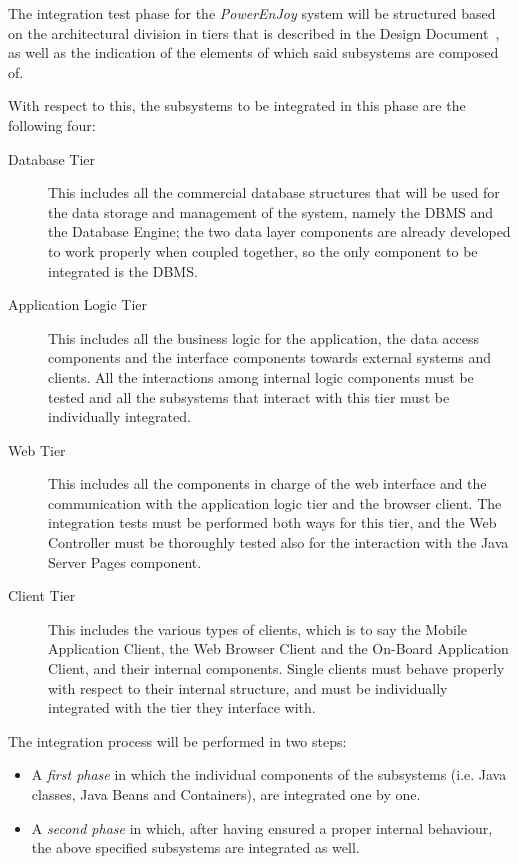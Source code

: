 The integration test phase for the \emph{PowerEnJoy} system will be structured based on the architectural division in tiers that is described in the Design Document~\cite{dd}, as well as the indication of the elements of which said subsystems are composed of.

With respect to this, the subsystems to be integrated in this phase are the following four:
\begin{description}
\item[Database Tier] This includes all the commercial database structures that will be used for the data storage and management of the system, namely the DBMS and the Database Engine; the two data layer components are already developed to work properly when coupled together, so the only component to be integrated is the DBMS.
\item[Application Logic Tier] This includes all the business logic for the application, the data access components and the interface components towards external systems and clients. All the interactions among internal logic components must be tested and all the subsystems that interact with this tier must be individually integrated.
\item[Web Tier] This includes all the components in charge of the web interface and the communication with the application logic tier and the browser client. The integration tests must be performed both ways for this tier, and the Web Controller must be thoroughly tested also for the interaction with the Java Server Pages component.
\item[Client Tier] This includes the various types of clients, which is to say the Mobile Application Client, the Web Browser Client and the On-Board Application Client, and their internal components. Single clients must behave properly with respect to their internal structure, and must be individually integrated with the tier they interface with.
\end{description}

The integration process will be performed in two steps:
\begin{itemize}
\item A \emph{first phase} in which the individual components of the subsystems (i.e. Java classes, Java Beans and Containers), are integrated one by one.
\item A \emph{second phase} in which, after having ensured a proper internal behaviour, the above specified subsystems are integrated as well.
\end{itemize}